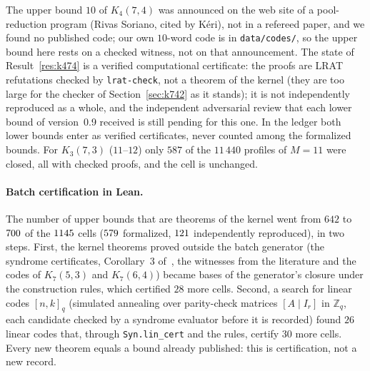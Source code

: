 \documentclass[11pt]{amsart}
\theoremstyle{definition}
\theoremstyle{remark}
\begin{document}
The upper bound $10$ of $K_4(7,4)$ was announced on the web site of a pool-reduction program (Rivas Soriano, cited by Kéri), not in a refereed paper, and we found no published code; our own $10$-word code is in \texttt{data/\allowbreak codes/}, so the upper bound here rests on a checked witness, not on that announcement.
The state of Result~\ref{res:k474} is a verified computational certificate: the proofs are LRAT refutations checked by \texttt{lrat-check}, not a theorem of the kernel (they are too large for the checker of Section~\ref{sec:k742} as it stands); it is not independently reproduced as a whole, and the independent adversarial review that each lower bound of version~0.9 received is still pending for this one.
In the ledger both lower bounds enter as verified certificates, never counted among the formalized bounds.
For $K_3(7,3)$ ($11$--$12$) only $587$ of the $11\,440$ profiles of $M=11$ were closed, all with checked proofs, and the cell is unchanged.

\paragraph{Batch certification in Lean.}
The number of upper bounds that are theorems of the kernel went from $642$ to $700$ of the $1145$ cells ($579$ formalized, $121$ independently reproduced), in two steps.
First, the kernel theorems proved outside the batch generator (the syndrome certificates, Corollary~3 of~\cite{ko2005}, the witnesses from the literature and the codes of $K_7(5,3)$ and $K_7(6,4)$) became bases of the generator's closure under the construction rules, which certified $28$ more cells.
Second, a search for linear codes $[n,k]_q$ (simulated annealing over parity-check matrices $[A\mid I_r]$ in $\mathbb{Z}_q$, each candidate checked by a syndrome evaluator before it is recorded) found $26$ linear codes that, through \texttt{Syn.\allowbreak lin\_\allowbreak cert} and the rules, certify $30$ more cells.
Every new theorem equals a bound already published: this is certification, not a new record.
\end{document}
